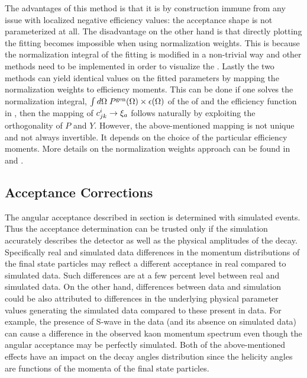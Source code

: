 The advantages of this method is that it is by construction immune from any issue with localized negative efficiency values:
the acceptance shape is not parameterized at all. The disadvantage on the other hand is that directly
plotting the fitting \pdf becomes impossible when using normalization weights. This is because the normalization integral
of the fitting \pdf is modified in a non-trivial way and other methods need to be implemented in order to visualize the \pdf.
Lastly the two methods can yield identical values on the
fitted parameters by mapping the normalization weights to efficiency moments. This can be done if one solves the normalization integral,
$\int d\Omega\;{P^{\text{gen}}(\Omega)}\times\epsilon(\Omega)$ of the \pdf of  and the efficiency function in ,
then the mapping of $c^{i}_{jk} \rightarrow \xi_a$ follows naturally by exploiting the orthogonality of $P$ and $Y$.
However, the above-mentioned mapping is not unique and not always invertible. It depends on the choice of the particular
efficiency moments. More details on the normalization weights approach can be found in \cite{jeroenThesis} and \cite{tristanThesis}.

\subsection{Acceptance Corrections}
\label{Accceptance_Corrections}
The angular acceptance described in section  is determined with simulated \BsJpsiKst events.
Thus the acceptance determination can be trusted only if the simulation accurately describes the detector as well as the
physical amplitudes of the \BsJpsiKst decay. Specifically real and simulated data differences in the momentum distributions 
of the final state particles may reflect a different acceptance in real compared to simulated data. 
Such differences are at a few percent level between real and simulated data.
On the other hand, differences between data and simulation could be also attributed to
differences in the underlying physical parameter values generating the simulated data compared to these
present in data. For example, the presence of S-wave in the data (and its absence on simulated data)
can cause a difference in the observed kaon momentum spectrum even though the angular acceptance may be perfectly simulated.
Both of the above-mentioned effects have an impact on the decay angles distribution since the helicity angles are functions
of the momenta of the final state particles.

